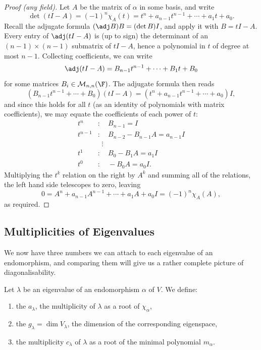 \begin{proof}[Proof (any field)]
    Let $A$ be the matrix of $\alpha$ in some basis, and write
    $$
    \det(tI - A) = (-1)^n \chi_A(t) = t^n + a_{n -1}t^{n-1} + \cdots + a_1 t + a_0.
    $$
    Recall the adjugate formula $(\adj B) B = (\det B) I$, and apply it with $B = tI - A$. Every entry of $\adj(tI - A)$ is (up to sign) the determinant of an $(n-1) \times (n-1)$ submatrix of $tI - A$, hence a polynomial in $t$ of degree at most $n - 1$. Collecting coefficients, we can write
    $$
    \adj(tI - A) = B_{n-1}t^{n-1} + \cdots + B_1 t + B_0
    $$
    for some matrices $B_i \in \mathcal{M}_{n,n}(\F)$. The adjugate formula then reads
    $$
    (B_{n-1}t^{n - 1} + \cdots + B_0)(tI - A) = (t^n + a_{n-1}t^{n-1} + \cdots + a_0) I,
    $$
    and since this holds for all $t$ (as an identity of polynomials with matrix coefficients), we may equate the coefficients of each power of $t$:
    \begin{align*}
        t^n &: \quad B_{n - 1} = I \\
        t^{n-1} &: \quad B_{n-2} - B_{n-1}A = a_{n-1}I\\
        &\;\; \vdots\\
        t^1 &: \quad B_0 - B_1 A = a_1 I \\
        t^0 &: \quad -B_0 A = a_0 I.
    \end{align*}
    Multiplying the $t^k$ relation on the right by $A^k$ and summing all of the relations, the left hand side telescopes to zero, leaving
    $$
    0 = A^n + a_{n-1}A^{n-1} + \cdots + a_1 A + a_0 I = (-1)^n\chi_A(A),
    $$
    as required.
\end{proof}

\subsection{Multiplicities of Eigenvalues}

We now have three numbers we can attach to each eigenvalue of an endomorphism, and comparing them will give us a rather complete picture of diagonalisability.

\begin{definition}
    Let $\lambda$ be an eigenvalue of an endomorphism $\alpha$ of $V$. We define:
    \begin{enumerate}[label=(\roman*)]
        \item the  $a_\lambda$, the multiplicity of $\lambda$ as a root of $\chi_\alpha$,
        \item the  $g_\lambda = \dim V_\lambda$, the dimension of the corresponding eigenspace,
        \item the multiplicity $c_\lambda$ of $\lambda$ as a root of the minimal polynomial $m_\alpha$.
    \end{enumerate}
\end{definition}

